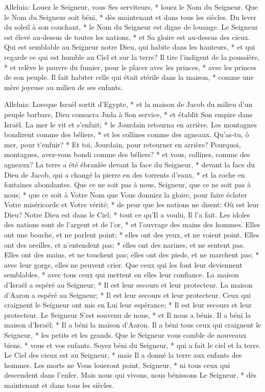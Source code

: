 Alleluia: Louez le Seigneur, vous Ses serviteurs, * louez le Nom du Seigneur.
Que le Nom du Seigneur soit béni, * dès maintenant et dans tous les siècles.
Du lever du soleil à son couchant, * le Nom du Seigneur est digne de louange.
Le Seigneur est élevé au-dessus de toutes les nations, * et Sa gloire est au-dessus des cieux.
Qui est semblable au Seigneur notre Dieu, qui habite dans les hauteurs, *
et qui regarde ce qui est humble au Ciel et sur la terre?
Il tire l'indigent de la poussière, * et relève le pauvre du fumier,
pour le placer avec les princes, * avec les princes de son peuple.
Il fait habiter celle qui était stérile dans la maison, * comme une mère joyeuse au milieu de ses enfants.

Alleluia: Lorsque Israël sortit d'Egypte, * et la maison de Jacob du milieu d'un peuple barbare,
Dieu consacra Juda à Son service, * et établit Son empire dans Israël.
La mer le vit et s'enfuit; * le Jourdain retourna en arrière.
Les montagnes bondirent comme des béliers, * et les collines comme des agneaux.
Qu'as-tu, ô mer, pour t'enfuir? * Et toi, Jourdain, pour retourner en arrière?
Pourquoi, montagnes, avez-vous bondi comme des béliers? * et vous, collines, comme des agneaux?
La terre a été ébranlée devant la face du Seigneur, * devant la face du Dieu de Jacob,
qui a changé la pierre en des torrents d'eaux, * et la roche en fontaines abondantes.
Que ce ne soit pas à nous, Seigneur, que ce ne soit pas à nous; * que ce soit à Votre Nom que Vous donniez la gloire,
pour faire éclater Votre miséricorde et Votre vérité; * de peur que les nations ne disent: Où est leur Dieu?
Notre Dieu est dans le Ciel; * tout ce qu'Il a voulu, Il l'a fait.
Les idoles des nations sont de l'argent et de l'or, * et l'ouvrage des mains des hommes.
Elles ont une bouche, et ne parlent point; * elles ont des yeux, et ne voient point.
Elles ont des oreilles, et n'entendent pas; * elles ont des narines, et ne sentent pas.
Elles ont des mains, et ne touchent pas; elles ont des pieds, et ne marchent pas; * avec leur gorge, elles ne peuvent crier.
Que ceux qui les font leur deviennent semblables, * avec tous ceux qui mettent en elles leur confiance.
La maison d'Israël a espéré au Seigneur; * Il est leur secours et leur protecteur.
La maison d'Aaron a espéré au Seigneur; * Il est leur secours et leur protecteur.
Ceux qui craignent le Seigneur ont mis en Lui leur espérance; * Il est leur secours et leur protecteur.
Le Seigneur S'est souvenu de nous, * et Il nous a bénis. Il a béni la maison d'Israël; * Il a béni la maison d'Aaron.
Il a béni tous ceux qui craignent le Seigneur, * les petits et les grands.
Que le Seigneur vous comble de nouveaux biens, * vous et vos enfants.
Soyez béni du Seigneur, * qui a fait le ciel et la terre.
Le Ciel des cieux est au Seigneur, * mais Il a donné la terre aux enfants des hommes.
Les morts ne Vous loueront point, Seigneur, * ni tous ceux qui descendent dans l'enfer.
Mais nous qui vivons, nous bénissons Le Seigneur, * dès maintenant et dans tous les siècles.


